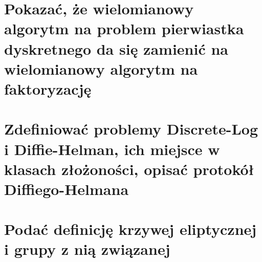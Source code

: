 \section{Pokazać, że wielomianowy algorytm na problem pierwiastka dyskretnego da się zamienić na wielomianowy algorytm na faktoryzację}
\label{A:question09}


\section{Zdefiniować problemy Discrete-Log i Diffie-Helman, ich miejsce w klasach złożoności, opisać protokół \\ Diffiego-Helmana}


\section{Podać definicję krzywej eliptycznej i grupy z nią związanej}
